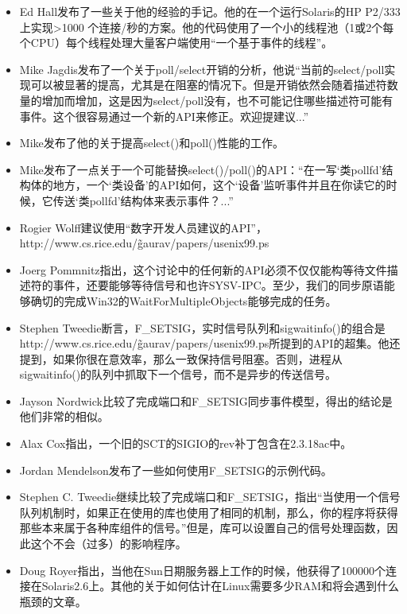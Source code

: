 \documentclass[twoside, xetex]{report}
\begin{document}
	\begin{itemize}
		\item Ed Hall发布了一些关于他的经验的手记。他的在一个运行Solaris的HP P2/333上实现>1000 个连接/秒的方案。他的代码使用了一个小的线程池（1或2个每个CPU）每个线程处理大量客户端使用“一个基于事件的线程”。
		\item Mike Jagdis发布了一个关于poll/select开销的分析，他说“当前的select/poll实现可以被显著的提高，尤其是在阻塞的情况下。但是开销依然会随着描述符数量的增加而增加，这是因为select/poll没有，也不可能记住哪些描述符可能有事件。这个很容易通过一个新的API来修正。欢迎提建议...”
		\item Mike发布了他的关于提高select()和poll()性能的工作。
		\item Mike发布了一点关于一个可能替换select()/poll()的API：“在一写‘类pollfd’结构体的地方，一个‘类设备’的API如何，这个‘设备’监听事件并且在你读它的时候，它传送‘类pollfd’结构体来表示事件？...”
		\item Rogier Wolff建议使用“数字开发人员建议的API”，http://www.cs.rice.edu/\~gaurav/papers/usenix99.ps
		\item Joerg Pommnitz指出，这个讨论中的任何新的API必须不仅仅能构等待文件描述符的事件，还要能够等待信号和也许SYSV-IPC。至少，我们的同步原语能够确切的完成Win32的WaitForMultipleObjects能够完成的任务。
		\item Stephen Tweedie断言，F\_SETSIG，实时信号队列和sigwaitinfo()的组合是http://www.cs.rice.edu/\~gaurav/papers/usenix99.ps所提到的API的超集。他还提到，如果你很在意效率，那么一致保持信号阻塞。否则，进程从sigwaitinfo()的队列中抓取下一个信号，而不是异步的传送信号。
		\item Jayson Nordwick比较了完成端口和F\_SETSIG同步事件模型，得出的结论是他们非常的相似。
		\item Alax Cox指出，一个旧的SCT的SIGIO的rev补丁包含在2.3.18ac中。
		\item Jordan Mendelson发布了一些如何使用F\_SETSIG的示例代码。
		\item Stephen C. Tweedie继续比较了完成端口和F\_SETSIG，指出“当使用一个信号队列机制时，如果正在使用的库也使用了相同的机制，那么，你的程序将获得那些本来属于各种库组件的信号。”但是，库可以设置自己的信号处理函数，因此这个不会（过多）的影响程序。
		\item Doug Royer指出，当他在Sun日期服务器上工作的时候，他获得了100000个连接在Solaris2.6上。其他的关于如何估计在Linux需要多少RAM和将会遇到什么瓶颈的文章。
	\end{itemize}
	
\end{document}
